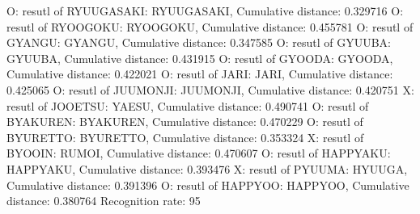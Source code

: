 O: resutl of RYUUGASAKI: RYUUGASAKI, Cumulative distance: 0.329716
O: resutl of RYOOGOKU: RYOOGOKU, Cumulative distance: 0.455781
O: resutl of GYANGU: GYANGU, Cumulative distance: 0.347585
O: resutl of GYUUBA: GYUUBA, Cumulative distance: 0.431915
O: resutl of GYOODA: GYOODA, Cumulative distance: 0.422021
O: resutl of JARI: JARI, Cumulative distance: 0.425065
O: resutl of JUUMONJI: JUUMONJI, Cumulative distance: 0.420751
X: resutl of JOOETSU: YAESU, Cumulative distance: 0.490741
O: resutl of BYAKUREN: BYAKUREN, Cumulative distance: 0.470229
O: resutl of BYURETTO: BYURETTO, Cumulative distance: 0.353324
X: resutl of BYOOIN: RUMOI, Cumulative distance: 0.470607
O: resutl of HAPPYAKU: HAPPYAKU, Cumulative distance: 0.393476
X: resutl of PYUUMA: HYUUGA, Cumulative distance: 0.391396
O: resutl of HAPPYOO: HAPPYOO, Cumulative distance: 0.380764
Recognition rate: 95%
